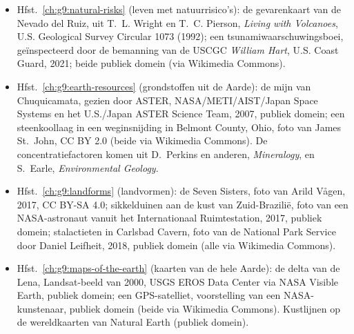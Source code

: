 \begin{itemize}
  \item Hfst.~\ref{ch:g9:natural-risks} (leven met natuurrisico's): de gevarenkaart van de Nevado del Ruiz, uit T.~L. Wright en T.~C. Pierson, \emph{Living with Volcanoes}, U.S. Geological Survey Circular 1073 (1992); een tsunamiwaarschuwingsboei, geïnspecteerd door de bemanning van de USCGC \emph{William Hart}, U.S. Coast Guard, 2021; beide publiek domein (via Wikimedia Commons).
  \item Hfst.~\ref{ch:g9:earth-resources} (grondstoffen uit de Aarde): de mijn van Chuquicamata, gezien door ASTER, NASA\slash METI\slash AIST\slash Japan Space Systems en het U.S./Japan ASTER Science Team, 2007, publiek domein; een steenkoollaag in een weginsnijding in Belmont County, Ohio, foto van James St.~John, CC BY 2.0 (beide via Wikimedia Commons). De concentratiefactoren komen uit D.~Perkins en anderen, \emph{Mineralogy}, en S.~Earle, \emph{Environmental Geology}.
  \item Hfst.~\ref{ch:g9:landforms} (landvormen): de Seven Sisters, foto van Arild Vågen, 2017, CC BY-SA 4.0; sikkelduinen aan de kust van Zuid-Brazilië, foto van een NASA-astronaut vanuit het Internationaal Ruimtestation, 2017, publiek domein; stalactieten in Carlsbad Cavern, foto van de National Park Service door Daniel Leifheit, 2018, publiek domein (alle via Wikimedia Commons).
  \item Hfst.~\ref{ch:g9:maps-of-the-earth} (kaarten van de hele Aarde): de delta van de Lena, Landsat-beeld van 2000, USGS EROS Data Center via NASA Visible Earth, publiek domein; een GPS-satelliet, voorstelling van een NASA-kunstenaar, publiek domein (beide via Wikimedia Commons). Kustlijnen op de wereldkaarten van Natural Earth (publiek domein).
\end{itemize}
